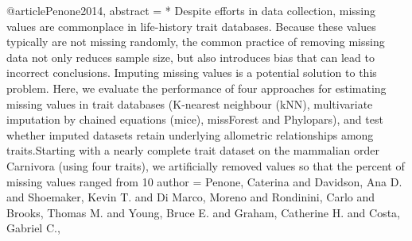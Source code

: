 {{{{@article{Penone2014,
abstract = {* Despite efforts in data collection, missing values are commonplace in life-history trait databases. Because these values typically are not missing randomly, the common practice of removing missing data not only reduces sample size, but also introduces bias that can lead to incorrect conclusions. Imputing missing values is a potential solution to this problem. Here, we evaluate the performance of four approaches for estimating missing values in trait databases (K-nearest neighbour (kNN), multivariate imputation by chained equations (mice), missForest and Phylopars), and test whether imputed datasets retain underlying allometric relationships among traits.\n\n* Starting with a nearly complete trait dataset on the mammalian order Carnivora (using four traits), we artificially removed values so that the percent of missing values ranged from 10%
author = {Penone, Caterina and Davidson, Ana D. and Shoemaker, Kevin T. and {Di Marco}, Moreno and Rondinini, Carlo and Brooks, Thomas M. and Young, Bruce E. and Graham, Catherine H. and Costa, Gabriel C.},
}}}}}}

